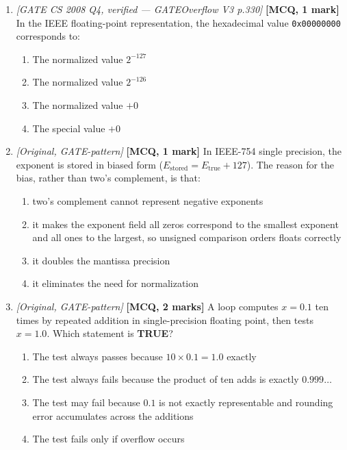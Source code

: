 \documentclass[11pt]{article}
\begin{document}
\begin{enumerate}
\item[\textbf{Q4}] \textit{[GATE CS 2008 Q4, verified --- GATEOverflow V3 p.330]} \textbf{[MCQ, 1 mark]} In the IEEE floating-point representation, the hexadecimal value \texttt{0x00000000} corresponds to:
\begin{enumerate}
  \item[(A)] The normalized value $2^{-127}$
  \item[(B)] The normalized value $2^{-126}$
  \item[(C)] The normalized value $+0$
  \item[(D)] The special value $+0$
\end{enumerate}

\item[\textbf{Q5}] \textit{[Original, GATE-pattern]} \textbf{[MCQ, 1 mark]} In IEEE-754 single precision, the exponent is stored in biased form ($E_{\text{stored}} = E_{\text{true}} + 127$). The reason for the bias, rather than two's complement, is that:
\begin{enumerate}
  \item[(A)] two's complement cannot represent negative exponents
  \item[(B)] it makes the exponent field all zeros correspond to the smallest exponent and all ones to the largest, so unsigned comparison orders floats correctly
  \item[(C)] it doubles the mantissa precision
  \item[(D)] it eliminates the need for normalization
\end{enumerate}

\item[\textbf{Q6}] \textit{[Original, GATE-pattern]} \textbf{[MCQ, 2 marks]} A loop computes $x = 0.1$ ten times by repeated addition in single-precision floating point, then tests $x = 1.0$. Which statement is \textbf{TRUE}?
\begin{enumerate}
  \item[(A)] The test always passes because $10 \times 0.1 = 1.0$ exactly
  \item[(B)] The test always fails because the product of ten adds is exactly $0.999\dots$
  \item[(C)] The test may fail because $0.1$ is not exactly representable and rounding error accumulates across the additions
  \item[(D)] The test fails only if overflow occurs
\end{enumerate}

\end{enumerate}
\end{document}
